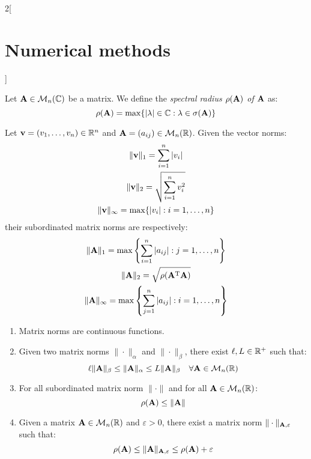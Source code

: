 \documentclass[../../../main.tex]{subfiles}
\begin{document}
\begin{multicols}{2}[\section{Numerical methods}]
  \begin{definition}
    Let $\boldsymbol{\mathrm{A}}\in\mathcal{M}_n(\mathbb{C})$ be a matrix. We define the \textit{spectral radius $\rho(\boldsymbol{\mathrm{A}})$ of $\boldsymbol{\mathrm{A}}$} as: $$\rho(\boldsymbol{\mathrm{A}})=\max\{|\lambda|\in\mathbb{C}:\lambda\in\sigma(\boldsymbol{\mathrm{A}})\}$$
  \end{definition}
  \begin{prop}
    Let $\boldsymbol{\mathrm{v}}=(v_1,\ldots,v_n)\in\mathbb{R}^n$ and $\boldsymbol{\mathrm{A}}=(a_{ij})\in\mathcal{M}_n(\mathbb{R})$. Given the vector norms:
    \begin{gather*}
      \|\boldsymbol{\mathrm{v}}\|_1=\sum_{i=1}^n|v_i|\\
      \|\boldsymbol{\mathrm{v}}\|_2=\sqrt{\sum_{i=1}^nv_i^2}\\
      \|\boldsymbol{\mathrm{v}}\|_\infty=\max\{|v_i|:i=1,\ldots,n\}
    \end{gather*}
    their subordinated matrix norms are respectively:
    \begin{gather*}
      \|\boldsymbol{\mathrm{A}}\|_1=\max\left\{\sum_{i=1}^n|a_{ij}|:j=1,\ldots,n\right\}\\
      \|\boldsymbol{\mathrm{A}}\|_2=\sqrt{\rho(\vb{A}^{\mathrm{T}}\boldsymbol{\mathrm{A}})}\\
      \|\boldsymbol{\mathrm{A}}\|_\infty=\max\left\{\sum_{j=1}^n|a_{ij}|:i=1,\ldots,n\right\}
    \end{gather*}
  \end{prop}
  \begin{prop}
    \hfill
    \begin{enumerate}
      \item Matrix norms are continuous functions.
      \item Given two matrix norms $\|\cdot\|_\alpha$ and $\|\cdot\|_\beta$, there exist $\ell, L\in\mathbb{R}^+$ such that: $$\ell \|\boldsymbol{\mathrm{A}}\|_\beta\leq\|\boldsymbol{\mathrm{A}}\|_\alpha\leq L\|\boldsymbol{\mathrm{A}}\|_\beta\quad\forall\boldsymbol{\mathrm{A}}\in\mathcal{M}_n(\mathbb{R})$$
      \item For all subordinated matrix norm $\|\cdot\|$ and for all $\boldsymbol{\mathrm{A}}\in\mathcal{M}_n(\mathbb{R})$: $$\rho(\boldsymbol{\mathrm{A}})\leq\|\boldsymbol{\mathrm{A}}\|$$
      \item Given a matrix $\boldsymbol{\mathrm{A}}\in\mathcal{M}_n(\mathbb{R})$ and $\varepsilon>0$, there exist a matrix norm $\|\cdot\|_{\boldsymbol{\mathrm{A}},\varepsilon}$ such that: $$\rho(\boldsymbol{\mathrm{A}})\leq\|\boldsymbol{\mathrm{A}}\|_{\boldsymbol{\mathrm{A}},\varepsilon}\leq\rho(\boldsymbol{\mathrm{A}})+\varepsilon$$
    \end{enumerate}

\end{prop}
\end{multicols}
\end{document}
